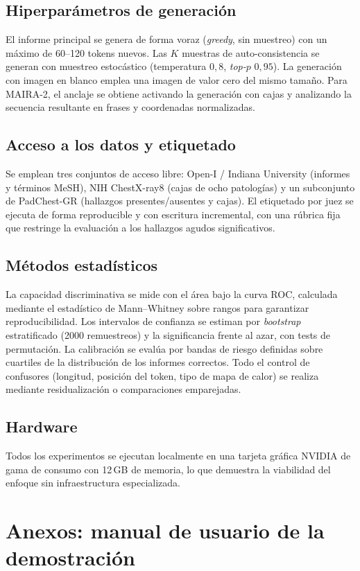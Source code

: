 \documentclass[12pt,a4paper]{report}
\begin{document}
\section{Hiperparámetros de generación}
El informe principal se genera de forma voraz (\textit{greedy}, sin muestreo) con un máximo
de 60--120 tokens nuevos. Las $K$ muestras de auto-consistencia se generan con muestreo estocástico
(temperatura $0{,}8$, \textit{top-}$p$ $0{,}95$). La generación con imagen en blanco emplea una imagen
de valor cero del mismo tamaño. Para MAIRA-2, el anclaje se obtiene activando la generación con cajas
y analizando la secuencia resultante en frases y coordenadas normalizadas.

\section{Acceso a los datos y etiquetado}
Se emplean tres conjuntos de acceso libre: Open-I / Indiana University (informes y términos MeSH), NIH
ChestX-ray8 (cajas de ocho patologías) y un subconjunto de PadChest-GR (hallazgos presentes/ausentes
y cajas). El etiquetado por juez se ejecuta de forma reproducible y con escritura incremental, con una
rúbrica fija que restringe la evaluación a los hallazgos agudos significativos.

\section{Métodos estadísticos}
La capacidad discriminativa se mide con el área bajo la curva ROC, calculada mediante el estadístico
de Mann--Whitney sobre rangos para garantizar reproducibilidad. Los intervalos de confianza se
estiman por \textit{bootstrap} estratificado (2000 remuestreos) y la significancia frente al azar, con
tests de permutación. La calibración se evalúa por bandas de riesgo definidas sobre cuartiles de la
distribución de los informes correctos. Todo el control de confusores (longitud, posición del token,
tipo de mapa de calor) se realiza mediante residualización o comparaciones emparejadas.

\section{Hardware}
Todos los experimentos se ejecutan localmente en una tarjeta gráfica NVIDIA de gama de consumo con
12\,GB de memoria, lo que demuestra la viabilidad del enfoque sin infraestructura especializada.

\chapter{Anexos: manual de usuario de la demostración}
\end{document}

